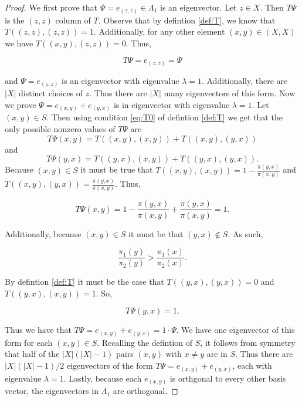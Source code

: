 \documentclass{amsart}
\newcommand{\1}{\mathbbm{1}}
\begin{document}
\begin{proof}
    We first prove that $\Psi = e_{(z,z)}\in\Lambda_1$ is an eigenvector. Let $z\in X$. Then $T\Psi$ is the $(z,z)$ column of $T$. Observe that by defintion \ref{def:T}, we know that $T((z,z),(z,z))=1$. Additionally, for any other element $(x,y)\in (X,X)$ we have $T((x,y),(z,z))=0$. Thus, 
    
    $$T\Psi=e_{(z,z)}=\Psi$$
    
    and $\Psi = e_{(z,z)}$ is an eigenvector with eigenvalue $\lambda=1$. Additionally, there are $|X|$ distinct choices of $z$. Thus there are $|X|$ many eigenvectors of this form. Now we prove $\Psi = e_{(x,y)}+e_{(y,x)}$ is in eigenvector with eigenvalue $\lambda=1$. Let $(x,y)\in S$. Then using condition \ref{eq:T0} of defintion \ref{def:T} we get that the only possible nonzero values of $T\Psi$ are 
    \[T\Psi(x,y)= T((x,y),(x,y))+ T((x,y),(y,x))\] 
    and 
    \[T\Psi(y,x)=T((y,x),(x,y)) + T((y,x),(y,x)).\] 
    Because $(x,y)\in S$ it must be true that $T((x,y),(x,y))=1-\frac{\pi(y,x)}{\pi(x,y)}$ and $T((x,y),(y,x))=\frac{\pi(y,x)}{\pi(x,y)}$. Thus,

    \[T\Psi(x,y)=1-\frac{\pi(y,x)}{\pi(x,y)}+\frac{\pi(y,x)}{\pi(x,y)}=1.\]

    Additionally, because $(x,y)\in S$ it must be that $(y,x)\not\in S$. As such,

    \[\frac{\pi_1(y)}{\pi_2(y)}> \frac{\pi_1(x)}{\pi_2(x)}.\]

    By defintion \ref{def:T} it must be the case that $T((y,x),(y,x))=0$ and $T((y,x),(x,y))=1$. So,

    \[T\Psi(y,x)=1.\]

    Thus we have that $T\Psi=e_{(x,y)}+e_{(y,x)}=1\cdot \Psi$. We have one eigenvector of this form for each $(x,y)\in S$. Recalling the defintion of $S$, it follows from symmetry that half of the $|X|(|X|-1)$ pairs $(x,y)$ with $x\neq y$ are in $S$. Thus there are $|X|(|X|-1)/2$ eigenvectors of the form $T\Psi=e_{(x,y)}+e_{(y,x)}$, each with eigenvalue $\lambda=1$. Lastly, because each $e_{(x,y)}$ is orthgonal to every other basis vector, the eigenvectors in $\Lambda_1$ are orthogonal.

    \vskip 0.5cm


\end{proof}
\end{document}

